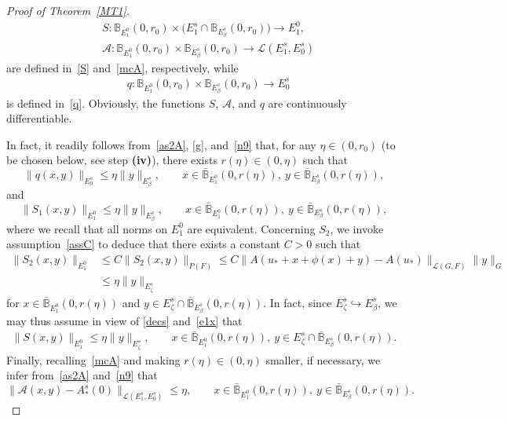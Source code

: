 \documentclass[reqno,11pt]{amsart}
\numberwithin{equation}{section}
\theoremstyle{remark}
\begin{document}
\begin{proof}[Proof of Theorem~\ref{MT1}]
\begin{align*}
&S: \mathbb{B}_{E_1^0}(0,r_0)\times\big(E_1^s\cap\mathbb{B}_{E_\beta^s}(0,r_0)\big)  \to  E_1^0,\\
&\mathcal{A}: \mathbb{B}_{E_1^0}(0,r_0)\times\mathbb{B}_{E_\beta^s}(0,r_0)  \to  \mathcal{L}(E_1^s,E_0^s)
\end{align*} 
 are defined in~\eqref{S} and~\eqref{mcA}, respectively, while 
\begin{align*}
&q: \mathbb{B}_{E_1^0}(0,r_0)\times\mathbb{B}_{E_\beta^s}(0,r_0)  \to  E_0^s
\end{align*}
 is defined in~\eqref{q}. Obviously, the functions $S$, $\mathcal{A}$, and $q$ are continuously differentiable.
 
 In fact, it readily follows from~\eqref{as2A}, \eqref{g}, and~\eqref{n9}
that, for any $\eta\in (0,r_0)$ (to be chosen  below, see step {\bf (iv)}), there exists $r(\eta)\in (0,\eta)$ such that
\begin{equation}\label{e2}
\|q(x,y)\|_{E_0^s}\le \eta \|y\|_{E_\beta^s}, \qquad x\in \bar{\mathbb{B}}_{E_1^0}(0,r(\eta)), \ y\in \bar{\mathbb{B}}_{E_\beta^s}(0,r(\eta)),
\end{equation}
and
\begin{equation} \label{e1x}
\|S_1(x,y)\|_{E_1^0}\le \eta \|y\|_{E_\beta^s}, \qquad x\in \bar{\mathbb{B}}_{E_1^0}(0,r(\eta)), \ y\in \bar{\mathbb{B}}_{E_\beta^s}(0,r(\eta)),
\end{equation}
where we recall that all norms on $E_1^0$ are equivalent. 
Concerning $S_2$, we invoke assumption~\eqref{assC} to deduce that there exists a constant $C>0$ such that
\begin{align*}
\|S_2(x,y)\|_{E_1^0}&\le C\|S_2(x,y)\|_{P(F)} \leq C \|A(u_*+x+\phi(x)+y)-A(u_*)\|_{\mathcal{L}(G,F)} \|y\|_{G}\\
&\le \eta \|y\|_{E_\zeta^s}
\end{align*}
for  $x\in \bar{\mathbb{B}}_{E_1^0}(0,r(\eta))$ and $y\in E_\zeta^s\cap\bar{\mathbb{B}}_{E_\beta^s}(0,r(\eta))$.
In fact, since $E_\zeta^s\hookrightarrow E_\beta^s$, we may thus assume in view of \eqref{decs} and~\eqref{e1x}  that
\begin{align}\label{e1}
\|S(x,y)\|_{E_1^0}\le \eta \|y\|_{E_\zeta^s}, \qquad x\in \bar{\mathbb{B}}_{E_1^0}(0,r(\eta)), \ y\in E_\zeta^s\cap\bar{\mathbb{B}}_{E_\beta^s}(0,r(\eta)).
\end{align}
 Finally, recalling~\eqref{mcA} and making $r(\eta)\in(0,\eta)$ smaller, if necessary, we infer from~\eqref{as2A} and~\eqref{n9} that
\begin{equation}\label{AA}
\|\mathcal{A}(x,y)-A_*^s(0)\|_{\mathcal{L}(E_1^s,E_0^s)}\le \eta , \qquad x\in \bar{\mathbb{B}}_{E_1^0}(0,r(\eta)), \ y\in \bar{\mathbb{B}}_{E_\beta^s}(0,r(\eta)).
\end{equation}


\end{proof}
\end{document}
